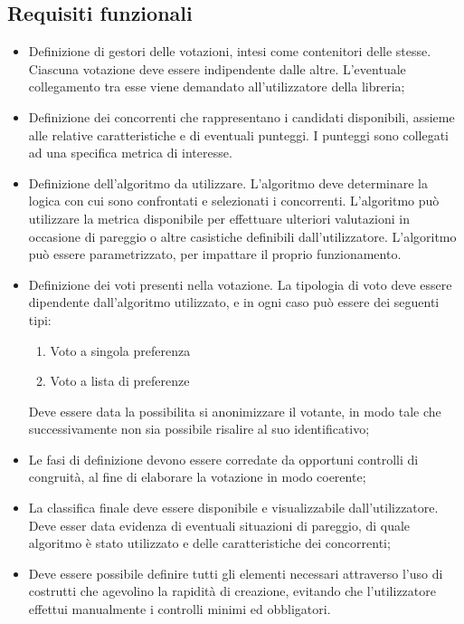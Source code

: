 \documentclass[12pt,a4paper,openright,twoside]{book}
\begin{document}
    \subsection{Requisiti funzionali}
    \begin{itemize}
        \item{Definizione di gestori delle votazioni, intesi come contenitori delle stesse. Ciascuna votazione
        deve essere indipendente dalle altre. L'eventuale collegamento tra esse viene demandato all'utilizzatore della libreria;}
        \item{Definizione dei concorrenti che rappresentano i candidati disponibili, assieme alle relative caratteristiche e di
        eventuali punteggi.
        I punteggi sono collegati ad una specifica metrica di interesse.
        }
        \item{Definizione dell'algoritmo da utilizzare. L'algoritmo deve determinare la logica con cui sono
        confrontati e selezionati i concorrenti. L'algoritmo può utilizzare la metrica disponibile per
        effettuare ulteriori valutazioni in occasione di pareggio o altre casistiche definibili dall'utilizzatore.
        L'algoritmo può essere parametrizzato, per impattare il proprio funzionamento.   }
        \item{Definizione dei voti presenti nella votazione. La tipologia di voto deve essere dipendente dall'algoritmo utilizzato,
        e in ogni caso può essere dei seguenti tipi:
        \begin{enumerate}
            \label{tipidivoto}
            \item{Voto a singola preferenza}
            \item{Voto a lista di preferenze}
        \end{enumerate}
        Deve essere data la possibilita si anonimizzare il votante, in modo tale che successivamente non sia possibile risalire al suo identificativo;
        }
        \item{Le fasi di definizione devono essere corredate da opportuni controlli di congruità, al fine di elaborare la votazione in modo coerente;}
        \item{La classifica finale deve essere disponibile e visualizzabile dall'utilizzatore. Deve esser data evidenza
        di eventuali situazioni di pareggio, di quale algoritmo è stato utilizzato e delle caratteristiche dei concorrenti;}
        \item{Deve essere possibile definire tutti gli elementi necessari attraverso l'uso di costrutti che agevolino la rapidità di creazione,
        evitando che l'utilizzatore effettui manualmente i controlli minimi ed obbligatori.}
    \end{itemize}
\end{document}

